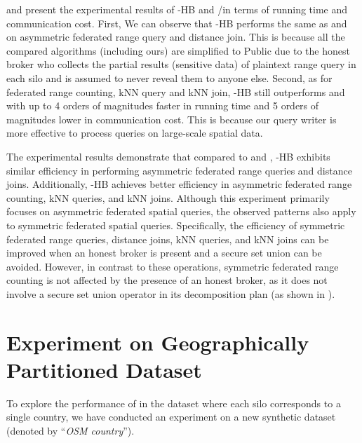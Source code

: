  and  present the experimental results of \sysname-HB and \smcql/\conclave in terms of running time and communication cost. First, We can observe that \sysname-HB performs the same as \smcql and \conclave on asymmetric federated range query and distance join. This is because all the compared algorithms (including ours) are simplified to Public due to the honest broker who collects the partial results (\ie sensitive data) of plaintext range query in each silo and is assumed to never reveal them to anyone else. Second, as for federated range counting, kNN query and kNN join, \sysname-HB still outperforms \smcql and \conclave with up to 4 orders of magnitudes faster in running time and 5 orders of magnitudes lower in communication cost. This is because our query writer is more effective to process queries on large-scale spatial data.

The experimental results demonstrate that compared to \smcql and \conclave, \sysname-HB exhibits similar efficiency in performing asymmetric federated range queries and distance joins. Additionally, \sysname-HB achieves better efficiency in asymmetric federated range counting, kNN queries, and kNN joins.
Although this experiment primarily focuses on asymmetric federated spatial queries, the observed patterns also apply to symmetric federated spatial queries. 
Specifically, the efficiency of symmetric federated range queries, distance joins, kNN queries, and kNN joins can be improved when an honest broker is present and a secure set union can be avoided.
However, in contrast to these operations, symmetric federated range counting is not affected by the presence of an honest broker, as it does not involve a secure set union operator in its decomposition plan (as shown in ).

\section{Experiment on Geographically Partitioned Dataset} \label{app:exp-geo}
To explore the performance of \sysname in the dataset where each silo corresponds to a single country, we have conducted an experiment on a new synthetic dataset (denoted by ``\textit{OSM country}'').

